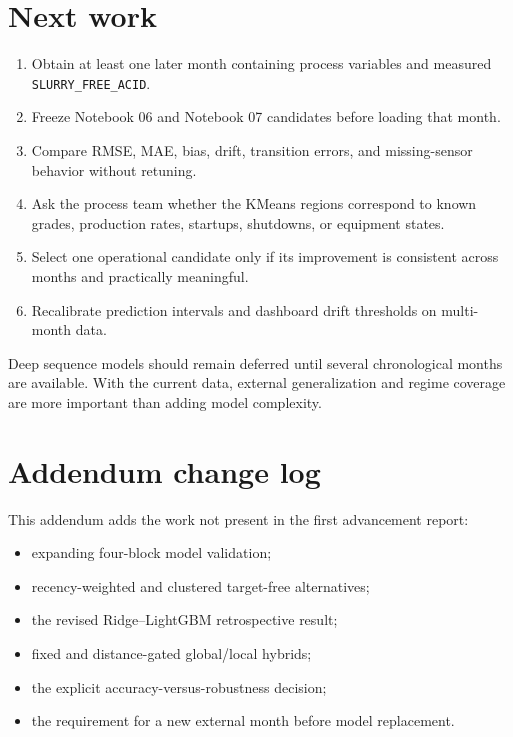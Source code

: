 \documentclass[10pt,a4paper]{article}
\begin{document}
\section{Next work}

\begin{enumerate}[leftmargin=1.5em,itemsep=3pt]
  \item Obtain at least one later month containing process variables and measured \texttt{SLURRY\_FREE\_ACID}.
  \item Freeze Notebook 06 and Notebook 07 candidates before loading that month.
  \item Compare RMSE, MAE, bias, drift, transition errors, and missing-sensor behavior without retuning.
  \item Ask the process team whether the KMeans regions correspond to known grades, production rates, startups, shutdowns, or equipment states.
  \item Select one operational candidate only if its improvement is consistent across months and practically meaningful.
  \item Recalibrate prediction intervals and dashboard drift thresholds on multi-month data.
\end{enumerate}

Deep sequence models should remain deferred until several chronological months are available. With the current data, external generalization and regime coverage are more important than adding model complexity.

\section*{Addendum change log}

This addendum adds the work not present in the first advancement report:
\begin{itemize}
  \item expanding four-block model validation;
  \item recency-weighted and clustered target-free alternatives;
  \item the revised Ridge--LightGBM retrospective result;
  \item fixed and distance-gated global/local hybrids;
  \item the explicit accuracy-versus-robustness decision;
  \item the requirement for a new external month before model replacement.
\end{itemize}
\end{document}
